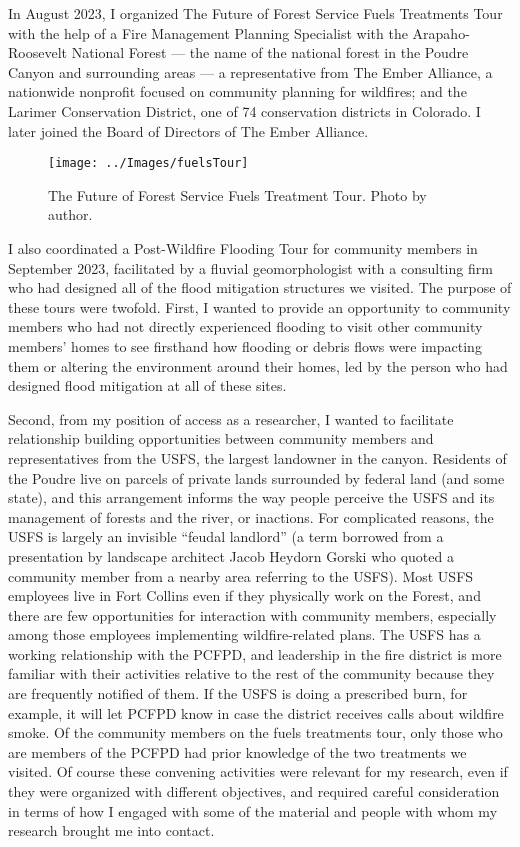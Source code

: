 \documentclass[
]{article}
\begin{document}
In August 2023, I organized The Future of Forest Service Fuels Treatments Tour with the help of a Fire Management Planning Specialist with the Arapaho-Roosevelt National Forest --- the name of the national forest in the Poudre Canyon and surrounding areas --- a representative from The Ember Alliance, a nationwide nonprofit focused on community planning for wildfires; and the Larimer Conservation District, one of 74 conservation districts in Colorado. I later joined the Board of Directors of The Ember Alliance.

\begin{figure}
\texttt{[image: ../Images/fuelsTour]} \caption[Fuels treatments tour]{The Future of Forest Service Fuels Treatment Tour. Photo by author.}\label{fig:figureTitle-29}
\end{figure}

I also coordinated a Post-Wildfire Flooding Tour for community members in September 2023, facilitated by a fluvial geomorphologist with a consulting firm who had designed all of the flood mitigation structures we visited. The purpose of these tours were twofold. First, I wanted to provide an opportunity to community members who had not directly experienced flooding to visit other community members' homes to see firsthand how flooding or debris flows were impacting them or altering the environment around their homes, led by the person who had designed flood mitigation at all of these sites.

Second, from my position of access as a researcher, I wanted to facilitate relationship building opportunities between community members and representatives from the USFS, the largest landowner in the canyon. Residents of the Poudre live on parcels of private lands surrounded by federal land (and some state), and this arrangement informs the way people perceive the USFS and its management of forests and the river, or inactions. For complicated reasons, the USFS is largely an invisible ``feudal landlord'' (a term borrowed from a presentation by landscape architect Jacob Heydorn Gorski who quoted a community member from a nearby area referring to the USFS). Most USFS employees live in Fort Collins even if they physically work on the Forest, and there are few opportunities for interaction with community members, especially among those employees implementing wildfire-related plans. The USFS has a working relationship with the PCFPD, and leadership in the fire district is more familiar with their activities relative to the rest of the community because they are frequently notified of them. If the USFS is doing a prescribed burn, for example, it will let PCFPD know in case the district receives calls about wildfire smoke. Of the community members on the fuels treatments tour, only those who are members of the PCFPD had prior knowledge of the two treatments we visited. Of course these convening activities were relevant for my research, even if they were organized with different objectives, and required careful consideration in terms of how I engaged with some of the material and people with whom my research brought me into contact.
\end{document}

